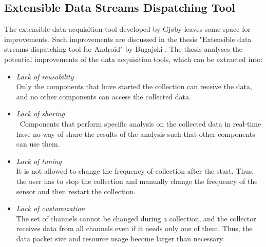 \subsection{Extensible Data Streams Dispatching Tool}\label{background:daniel}
The extensible data acquisition tool developed by Gjøby leaves some space for improvements. Such improvements are discussed in the thesis "Extensible data streams dispatching tool for Android" by Bugajski \cite{daniel}. The thesis analyses the potential improvements of the data acquisition tools, which can be extracted into:
\begin{itemize}
    \item \textit{Lack of reusability} \\ Only the components that have started the collection can receive the data, and no other components can access the collected data.
    \item \textit{Lack of sharing} \\ Components that perform specific analysis on the collected data in real-time have no way of share the results of the analysis such that other components can use them. 
    \item \textit{Lack of tuning} \\ It is not allowed to change the frequency of collection after the start. Thus, the user has to stop the collection and manually change the frequency of the sensor and then restart the collection. 
    \item \textit{Lack of customization} \\ The set of channels cannot be changed during a collection, and the collector receives data from all channels even if it needs only one of them. Thus, the data packet size and resource usage become larger than necessary.
\end{itemize}

